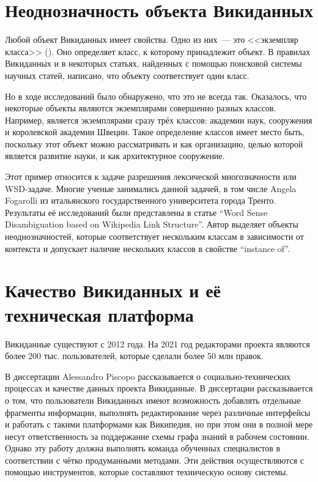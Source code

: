 \section{Неоднозначность объекта Викиданных}

Любой объект Викиданных имеет свойства. Одно из них~--- это <<экземпляр класса>> (). Оно определяет класс, к которому принадлежит объект. В правилах Викиданных и в некоторых статьях\cite{BabelNet}, найденных с помощью поисковой системы научных статей\footnotemark {}, написано, что объекту соответствует один класс.

Но в ходе исследований было обнаружено, что это не всегда так. Оказалось, что некоторые объекты являются экземплярами совершенно разных классов. Например,  является экземплярами сразу трёх классов: академии наук, сооружения и королевской академии Швеции. Такое определение классов имеет место быть, поскольку этот объект можно рассматривать и как организацию, целью которой является развитие науки, и как архитектурное сооружение. 

Этот пример относится к задаче разрешения лексической многозначности или WSD-задаче. Многие ученые занимались данной задачей, в том числе Angela Fogarolli из итальянского государственного университета города Тренто. Результаты её исследований были представлены в статье ``Word Sense Disambiguation based on Wikipedia Link Structure''\cite{Fogarolli}. Автор выделяет объекты неоднозначностей, которые соответствует нескольким классам в зависимости от контекста и допускает наличие нескольких классов в свойстве ``instance of''.

\section{Качество Викиданных и её техническая платформа}

Викиданные существуют с 2012 года. На 2021 год редакторами проекта являются более 200 тыс. пользователей, которые сделали более 50 млн правок.

В диссертации Alessandro Piscopo\cite{Piscopo} рассказывается о социально-технических процессах и качестве данных проекта Викиданные. В диссертации рассказывается о том, что пользователи Викиданных имеют возможность добавлять отдельные фрагменты информации, выполнять редактирование через различные интерфейсы и работать с такими платформами как Википедия, но при этом они в полной мере несут ответственность за поддержание схемы графа знаний в рабочем состоянии. Однако эту работу должна выполнять команда обученных специалистов в соответствии с чётко продуманными методами. Эти действия осуществляются с помощью инструментов, которые составляют техническую основу системы.

